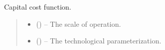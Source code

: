 \documentclass[letterpaper,10pt,english]{sphinxmanual}
\begin{document}
\begin{fulllineitems}
\label{\detokenize{technology:technology.technology_a_model.fixed_cost}}
\pysigstartsignatures
{}
\pysigstopsignatures
\sphinxAtStartPar
Capital cost function.
\begin{quote}\begin{description}
\begin{itemize}
\item {} 
\sphinxAtStartPar
{} () – The scale of operation.

\item {} 
\sphinxAtStartPar
{} () – The technological parameterization.

\end{itemize}

\end{description}\end{quote}

\end{fulllineitems}

\end{document}
